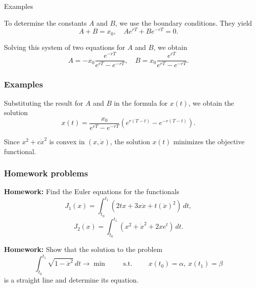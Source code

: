 \documentclass[10pt]{beamer}
\theoremstyle{definition}
\begin{document}
\begin{section}{Examples}
\begin{frame}[fragile]
\begin{example}[cont.]
To determine the constants $ A $ and $ B $, we use the boundary conditions. They yield \[ A + B = x_0, \quad A e^{rT}+B e^{-rT} = 0. \]

Solving this system of two equations for $ A $ and $ B $, we obtain \[ A = -x_0 \dfrac{e^{-rT}}{e^{rT}-e^{-rT}},\quad B = x_0 \dfrac{e^{rT}}{e^{rT}-e^{-rT}}. \] 
\end{example}
\end{frame}

\begin{frame}[fragile]
\frametitle{Examples}\addtocounter{theorem}{-1}
\begin{example}[cont.]
Substituting the result for $ A $ and $ B $ in the formula for $ x(t) $, we obtain the solution \[ x(t) = \dfrac{x_0}{e^{rT}-e^{-rT}}\left( e^{r(T-t)}-e^{-r(T-t)}\right). \]\bigskip

Since $ x^2 + c \dot{x}^2 $ is convex in $ (x,\dot{x}) $, the solution $ x(t) $ minimizes the objective functional.
\end{example}
\end{frame}

\begin{frame}[fragile]
\frametitle{Homework problems}
\textbf{Homework:} Find the Euler equations for the functionals \[ J_1(x)=\int_{t_0}^{t_1} \left(2tx+3x\dot{x}+t(\dot{x})^2\right)\,dt, \]
\[ J_2(x)=\int_{t_0}^{t_1} \left( x^2 + \dot{x}^2+2xe^t \right)\,dt. \]\bigskip

\textbf{Homework:} Show that the solution to the problem \[ \int_{t_0}^{t_1} \sqrt{1-\dot{x}^2}\,dt \rightarrow \min \qquad \text{ s.t. }\qquad x(t_0)=\alpha,~x(t_1)=\beta\] is a straight line and determine its equation.
\end{frame}


\end{section}
\end{document}
